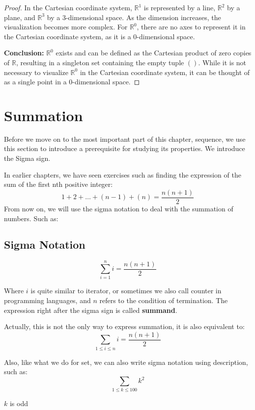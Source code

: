 \begin{proof}
	In the Cartesian coordinate system, $\mathbb{R}^1$ is represented by a line, $\mathbb{R}^2$ by a plane, and $\mathbb{R}^3$ by a 3-dimensional space. As the dimension increases, the visualization becomes more complex. For $\mathbb{R}^0$, there are no axes to represent it in the Cartesian coordinate system, as it is a 0-dimensional space.
	
	\textbf{Conclusion:}
	$\mathbb{R}^0$ exists and can be defined as the Cartesian product of zero copies of $\mathbb{R}$, resulting in a singleton set containing the empty tuple $()$. While it is not necessary to visualize $\mathbb{R}^0$ in the Cartesian coordinate system, it can be thought of as a single point in a 0-dimensional space.
\end{proof}
\section{Summation}
Before we move on to the most important part of this chapter, sequence, we use this section to introduce a prerequisite for studying its properties. We introduce the Sigma sign.

In earlier chapters, we have seen exercises such as finding the expression of the sum of the first nth positive integer:
$$1 + 2 + \dots + (n-1) + (n)= \frac{n(n+1)}{2}$$ 
From now on, we will use the sigma notation to deal with the summation of numbers. Such as:
\subsection{Sigma Notation}
\begin{notation}
    \[
\sum_{i=1}^{n} i = \frac{n(n + 1)}{2}
    \]
\end{notation}
Where $i$ is quite similar to iterator, or sometimes we also call counter in programming languages, and $n$ refers to the condition of termination. The expression right after the sigma sign is called \textbf{summand}.

Actually, this is not the only way to express summation, it is also equivalent to:
\[\sum_{1\leq i\leq n} i = \frac{n(n+1)}{2}\]

Also, like what we do for set, we can also write sigma notation using description, such as: 
\[
\sum_{1 \leq k \leq 100} k^2
\]

\( k \) is odd

